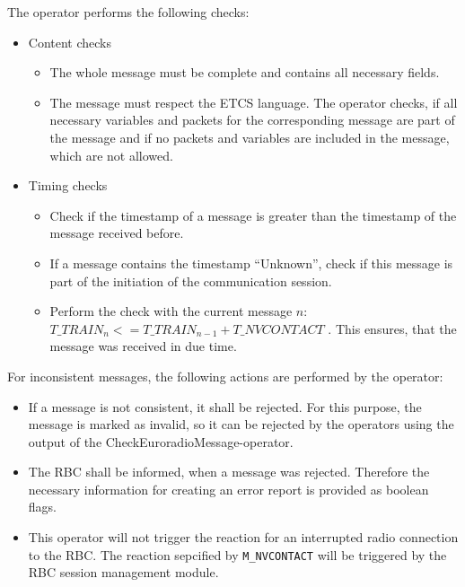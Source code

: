 The operator performs the following checks:
\begin{itemize}
\item Content checks
    \begin{itemize}
    \item The whole message must be complete and contains all necessary fields. \cite[3.16.1.1]{subset-026}
    \item The message must respect the ETCS language. \cite[3.16.1.1]{subset-026} The operator checks, if all necessary variables and packets for the corresponding message are part of the message and if no packets and variables are included in the message, which are not allowed.
    \end{itemize}
\item Timing checks
  \begin{itemize}
    \item Check if the timestamp of a message is greater than the timestamp of the message received before. \cite[3.16.3.3.3]{subset-026}
    \item If a message contains the timestamp ``Unknown'', check if this message is part of the initiation of the communication session. \cite[3.16.3.3.4]{subset-026}
    \item Perform the check with the current message $n$:  $T\_TRAIN_{n} <= T\_TRAIN_{n-1} + T\_NVCONTACT$ \cite[3.16.1.1]{subset-026}. This ensures, that the message was received in due time.
  \end{itemize}
\end{itemize}

For inconsistent messages, the following actions are performed by the operator:
\begin{itemize}
  \item If a message is not consistent, it shall be rejected. \cite[3.16.3.1.1.1]{subset-026} For this purpose, the message is marked as invalid, so it can be rejected by the operators using the output of the CheckEuroradioMessage-operator.
  \item The RBC shall be informed, when a message was rejected. \cite[3.16.3.1.1.2]{subset-026} Therefore the necessary information for creating an error report is provided as boolean flags. 
  \item This operator will not trigger the reaction for an interrupted radio connection to the RBC. The reaction sepcified by \texttt{M\_NVCONTACT} will be triggered by the RBC session management module.
\end{itemize}

